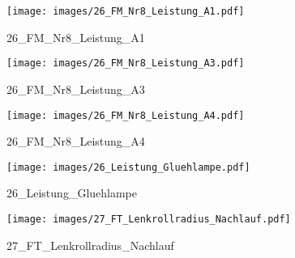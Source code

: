 %
%
\begin{figure}[!hb]%
    \centering
  \texttt{[image: images/26\_FM\_Nr8\_Leistung\_A1.pdf]}%
  \caption{26_FM_Nr8_Leistung_A1}%
\end{figure}

%
%
\begin{figure}[!hb]%
    \centering
  \texttt{[image: images/26\_FM\_Nr8\_Leistung\_A3.pdf]}%
  \caption{26_FM_Nr8_Leistung_A3}%
\end{figure}

%
%
\begin{figure}[!hb]%
    \centering
  \texttt{[image: images/26\_FM\_Nr8\_Leistung\_A4.pdf]}%
  \caption{26_FM_Nr8_Leistung_A4}%
\end{figure}

%
%
\begin{figure}[!hb]%
    \centering
  \texttt{[image: images/26\_Leistung\_Gluehlampe.pdf]}%
  \caption{26_Leistung_Gluehlampe}%
\end{figure}

%
%
\begin{figure}[!hb]%
    \centering
  \texttt{[image: images/27\_FT\_Lenkrollradius\_Nachlauf.pdf]}%
  \caption{27_FT_Lenkrollradius_Nachlauf}%
\end{figure}

